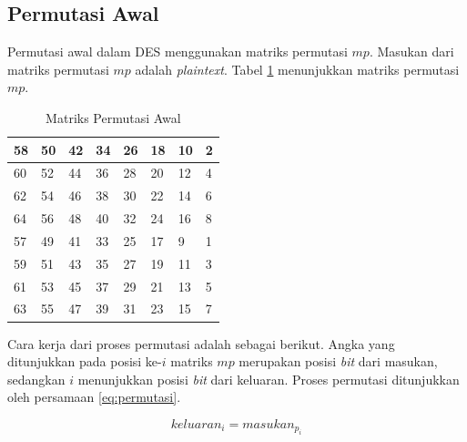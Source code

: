 \subsection{Permutasi Awal}\label{subsec:permutasiawal}

Permutasi awal dalam DES menggunakan matriks permutasi \begin{math}mp\end{math}. Masukan dari matriks permutasi \begin{math}mp\end{math} adalah \textit{plaintext}. Tabel \ref{table:awal} menunjukkan matriks permutasi \begin{math}mp\end{math}.

\begin{table}[H]
	\centering
	\caption{Matriks Permutasi Awal}\label{table:awal}
	\begin{tabular}{|l|l|l|l|l|l|l|l|}
			\hline
			58	&	50	&	42	&	34	&	26	&	18	&	10	&	2	\\ \hline
			60	&	52	&	44	&	36	&	28	&	20	&	12	&	4	\\ \hline
			62	&	54	&	46	&	38	&	30	&	22	&	14	&	6	\\ \hline
			64	&	56	&	48	&	40	&	32	&	24	&	16	&	8	\\ \hline
			57	&	49	&	41	&	33	&	25	&	17	&	9	&	1	\\ \hline
			59	&	51	&	43	&	35	&	27	&	19	&	11	&	3	\\ \hline
			61	&	53	&	45	&	37	&	29	&	21	&	13	&	5	\\ \hline
			63	&	55	&	47	&	39	&	31	&	23	&	15	&	7	\\ \hline
	\end{tabular}
\end{table}

Cara kerja dari proses permutasi adalah sebagai berikut. Angka yang ditunjukkan pada posisi ke-\begin{math}i\end{math} matriks \begin{math}mp\end{math} merupakan posisi \textit{bit} dari masukan, sedangkan \begin{math}i\end{math} menunjukkan posisi \textit{bit} dari keluaran. Proses permutasi ditunjukkan oleh persamaan \ref{eq:permutasi}.

\begin{equation}
	keluaran_i = masukan_{p_i}
	\label{eq:permutasi}
\end{equation}


